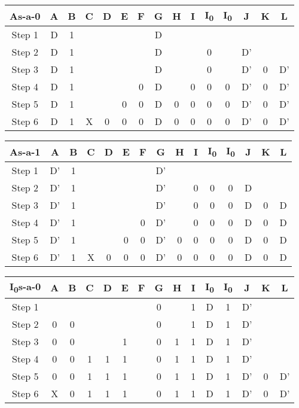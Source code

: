 \documentclass[11pt]{report}
\begin{document}
\begin{tabular}{ |c||c|c|c|c|c|c|c|c|c|c|c|c|c|c|}
\hline
\bf As-a-0 & \bf A & \bf B & \bf C & \bf D & \bf E & \bf F & G & H & I & I\textsubscript{0} & I\textsubscript{0} & J & K & \bf L \\
\hline
\hline
Step 1 & D & 1 & & & & & D & & & & & & & \\
\hline
Step 2 & D & 1 & & & & & D & & & 0 & & D' & & \\
\hline
Step 3 & D & 1 & & & & & D & & & 0 & & D' & 0 & D' \\
\hline
Step 4 & D & 1 & & & & 0 & D & & 0 & 0 & 0 & D' & 0 & D' \\
\hline
Step 5 & D & 1 & & & 0 & 0 & D & 0 & 0 & 0 & 0 & D' & 0 & D' \\
\hline
Step 6 & D & 1 & X & 0 & 0 & 0 & D & 0 & 0 & 0 & 0 & D' & 0 & D' \\
\hline
\end{tabular}


\begin{tabular}{ |c||c|c|c|c|c|c|c|c|c|c|c|c|c|c| }
\hline
\bf As-a-1 & \bf A & \bf B & \bf C & \bf D & \bf E & \bf F & G & H & I & I\textsubscript{0} & I\textsubscript{0} & J & K & \bf L \\
\hline
\hline
Step 1 & D' & 1 & & & & & D' & & & & & & & \\
\hline
Step 2 & D' & 1 & & & & & D' & & 0 & 0 & 0 & D & & \\
\hline
Step 3 & D' & 1 & & & & & D' & & 0 & 0 & 0 & D & 0 & D \\
\hline
Step 4 & D' & 1 & & & & 0 & D' & & 0 & 0 & 0 & D & 0 & D \\
\hline
Step 5 & D' & 1 & & & 0 & 0 & D' & 0 & 0 & 0 & 0 & D & 0 & D \\
\hline
Step 6 & D' & 1 & X & 0 & 0 & 0 & D' & 0 & 0 & 0 & 0 & D & 0 & D \\
\hline
\end{tabular}



\begin{tabular}{ |c||c|c|c|c|c|c|c|c|c|c|c|c|c|c| }
\hline
\bf I\textsubscript{0}s-a-0 & \bf A & \bf B & \bf C & \bf D & \bf E & \bf F & G & H & I & I\textsubscript{0} & I\textsubscript{0} & J & K & \bf L \\
\hline
\hline
Step 1 & & & & & & & 0 & & 1 & D & 1 & D' & & \\
\hline
Step 2 & 0 & 0 & & & & & 0 & & 1 & D & 1 & D' & & \\
\hline
Step 3 & 0 & 0 & & & 1 & & 0 & 1 & 1 & D & 1 & D' & & \\
\hline
Step 4 & 0 & 0 & 1 & 1 & 1 & & 0 & 1 & 1 & D & 1 & D' & & \\
\hline
Step 5 & 0 & 0 & 1 & 1 & 1 & & 0 & 1 & 1 & D & 1 & D' & 0 & D' \\
\hline
Step 6 & X & 0 & 1 & 1 & 1 & & 0 & 1 & 1 & D & \cellcolor{yellow!50}1 & D' & \cellcolor{yellow!50}0 & D' \\
\hline
\end{tabular}
\end{document}
